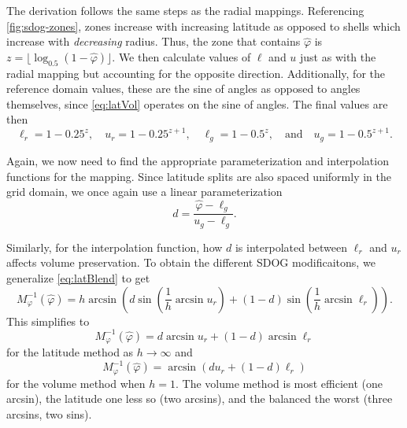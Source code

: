The derivation follows the same steps as the radial mappings.
Referencing \cref{fig:sdog-zones}, zones increase with increasing latitude as opposed to shells which increase with \textit{decreasing} radius.
Thus, the zone that contains $\hat{\varphi}$ is $z = \lfloor \log_{0.5} ( 1 - \hat{\varphi} ) \rfloor$.
We then calculate values of $\ell$ and $u$ just as with the radial mapping but accounting for the opposite direction.
Additionally, for the reference domain values, these are the sine of angles as opposed to angles themselves, since \cref{eq:latVol} operates on the sine of angles.
The final values are then
%
\begin{equation*}
\ell_r = 1 - 0.25^{z}, \quad u_r = 1 - 0.25^{z + 1}, \quad \ell_g = 1 - 0.5^z, \quad \text{and} \quad u_g = 1 - 0.5^{z + 1}.
\end{equation*}
%

Again, we now need to find the appropriate parameterization and interpolation functions for the mapping.
Since latitude splits are also spaced uniformly in the grid domain, we once again use a linear parameterization
%
\begin{equation} \label{eq:latInvD}
d = \frac{ \hat{\varphi} - \ell_g }{ u_g - \ell_g }.
\end{equation}

Similarly, for the interpolation function, how $d$ is interpolated between $\ell_r$ and $u_r$ affects volume preservation.
To obtain the different SDOG modificaitons, we generalize \cref{eq:latBlend} to get
%
\begin{equation} \label{eq:latInv}
M_\varphi^{-1}(\hat{\varphi}) = h \arcsin \left( d \sin \left( \frac{1}{h} \arcsin u_r \right) + \left( 1 - d \right) \sin \left( \frac{1}{h} \arcsin \ell_r \right) \right).
\end{equation}
%
This simplifies to
%
\begin{equation*}
M_\varphi^{-1}(\hat{\varphi}) = d \arcsin u_r  + \left( 1 - d \right) \arcsin \ell_r
\end{equation*}
%
for the latitude method as $h \rightarrow \infty$ and
%
\begin{equation*}
M_\varphi^{-1}(\hat{\varphi}) = \arcsin \left( d u_r + \left( 1 - d \right) \ell_r \right)
\end{equation*}
%
for the volume method when $h = 1$.
The volume method is most efficient (one arcsin), the latitude one less so (two arcsins), and the balanced the worst (three arcsins, two sins).


